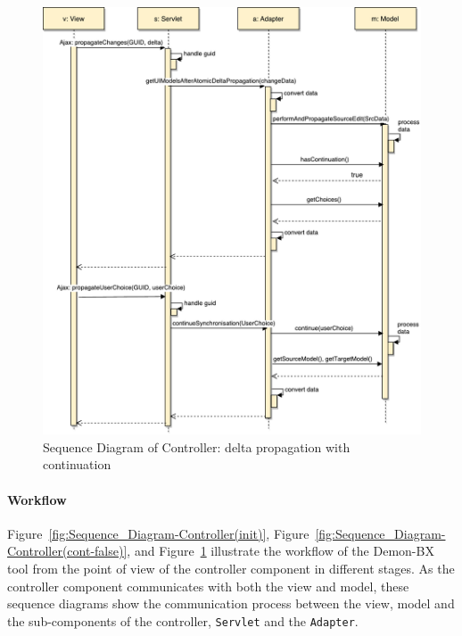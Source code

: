 \begin{figure}
	\centering
	\includegraphics[width=1\textwidth]{figures/Sequence_Diagram-Controller(cont-true)}
	\caption{Sequence Diagram of Controller: delta propagation with continuation}
	\label{fig:Sequence_Diagram-Controller(cont-true)}
\end{figure}

\paragraph{Workflow}
Figure~\ref{fig:Sequence_Diagram-Controller(init)}, 
Figure~\ref{fig:Sequence_Diagram-Controller(cont-false)},
and Figure~\ref{fig:Sequence_Diagram-Controller(cont-true)} illustrate the workflow of the Demon-BX tool from the point of view of the controller component in different stages. As the controller component communicates with both the view and model, these sequence diagrams show the communication process between the view, model and the sub-components of the controller, \texttt{Servlet} and the \texttt{Adapter}.

